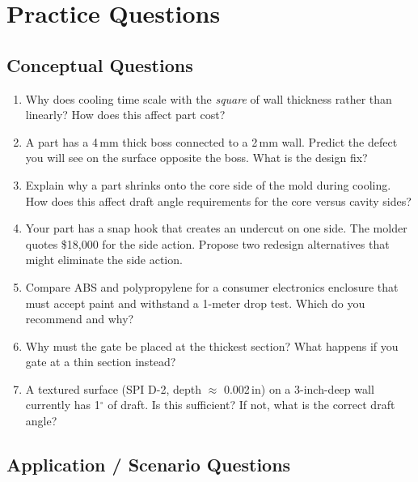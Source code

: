 \documentclass[11pt,letterpaper,twoside,openany]{book}
\providecommand{\ang}[1]{#1\ensuremath{{}^{\circ}}}
\begin{document}
\FloatBarrier
\section{Practice Questions}
\label{sec:practice}

\subsection{Conceptual Questions}

\begin{enumerate}[leftmargin=1.5em]
  \item Why does cooling time scale with the \emph{square} of wall thickness rather than linearly? How does this affect part cost?

  \item A part has a 4\,mm thick boss connected to a 2\,mm wall. Predict the defect you will see on the surface opposite the boss. What is the design fix?

  \item Explain why a part shrinks onto the core side of the mold during cooling. How does this affect draft angle requirements for the core versus cavity sides?

  \item Your part has a snap hook that creates an undercut on one side. The molder quotes \$18,000 for the side action. Propose two redesign alternatives that might eliminate the side action.

  \item Compare ABS and polypropylene for a consumer electronics enclosure that must accept paint and withstand a 1-meter drop test. Which do you recommend and why?

  \item Why must the gate be placed at the thickest section? What happens if you gate at a thin section instead?

  \item A textured surface (SPI D-2, depth $\approx$ 0.002\,in) on a 3-inch-deep wall currently has \ang{1} of draft. Is this sufficient? If not, what is the correct draft angle?
\end{enumerate}

\subsection{Application / Scenario Questions}
\end{document}
